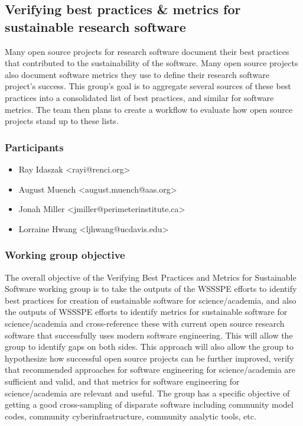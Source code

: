 \subsection{Verifying best practices \& metrics for sustainable research software}
\label{sec:best-practices-sustainable}


Many open source projects for research software document their best practices that contributed to the sustainability of the software.  Many open source projects also document software metrics they use to define their research software project's success.  This group's goal is to aggregate several sources of these best practices into a consolidated list of best practices, and similar for software metrics.  The team then plans to create a workflow to evaluate how open source projects stand up to these lists.

\subsubsection{Participants}

\begin{itemize}
\item Ray Idaszak <rayi@renci.org>
\item August Muench <august.muench@aas.org>
\item Jonah Miller <jmiller@perimeterinstitute.ca>
\item Lorraine Hwang <ljhwang@ucdavis.edu>
\end{itemize}

\subsubsection{Working group objective}

The overall objective of the Verifying Best Practices and Metrics for Sustainable Software working group is to take the outputs of the WSSSPE efforts to identify best practices for creation of sustainable software for science/academia, and also the outputs of WSSSPE efforts to identify metrics for sustainable software for science/academia and cross-reference these with current open source research software that successfully uses modern software engineering.  This will allow the group to identify gaps on both sides.  This approach will also allow the group to hypothesize how successful open source projects can be further improved, verify that recommended approaches for software engineering for science/academia are sufficient and valid, and that metrics for software engineering for science/academia are relevant and useful.  The group has a specific objective of getting a good cross-sampling of disparate software including community model codes, community cyberinfrastructure, community analytic tools, etc.

